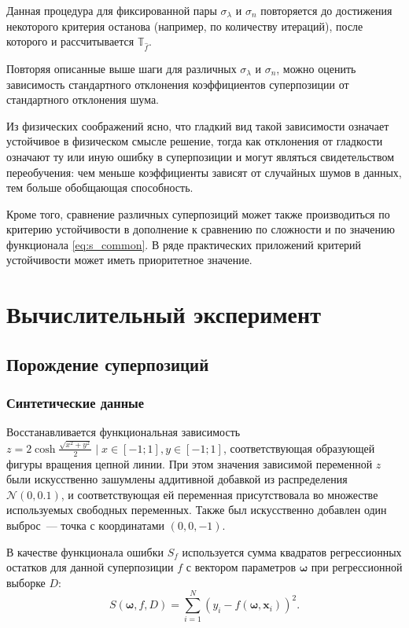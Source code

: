 \documentclass[12pt,a4paper]{article}
\begin{document}
Данная процедура для фиксированной пары $\sigma_{\lambda}$ и $\sigma_n$ повторяется
до достижения некоторого критерия останова (например, по количеству итераций),
после которого и рассчитывается $\mathbb{T}_{\hat{f}}$.

Повторяя описанные выше шаги для различных $\sigma_{\lambda}$ и $\sigma_n$, можно
оценить зависимость стандартного отклонения коэффициентов суперпозиции от
стандартного отклонения шума.

Из физических соображений ясно, что гладкий вид такой зависимости означает устойчивое в
физическом смысле решение, тогда как отклонения от гладкости означают
ту или иную ошибку в суперпозиции и могут являться свидетельством переобучения:
чем меньше коэффициенты зависят от случайных шумов в данных, тем больше обобщающая
способность.

Кроме того, сравнение различных суперпозиций может также производиться по
критерию устойчивости в дополнение к сравнению по сложности и по значению
функционала \eqref{eq:s_common}. В ряде практических приложений критерий устойчивости
может иметь приоритетное значение.

\section{Вычислительный эксперимент}

\subsection{Порождение суперпозиций}

\subsubsection{Синтетические данные}
Восстанавливается функциональная зависимость
$z = 2 \cosh \frac{\sqrt{x^2 + y^2}}{2} \mid x \in [-1; 1], y \in [-1; 1]$,
соответствующая образующей фигуры вращения цепной линии. При этом значения зависимой
переменной $z$ были искусственно зашумлены аддитивной добавкой из
распределения $\mathcal{N} (0, 0.1)$, и соответствующая ей переменная
присутствовала во множестве используемых свободных переменных.
Также был искусственно добавлен один
выброс~--- точка с координатами $(0, 0, -1)$.

В качестве функционала ошибки $S_f$ используется сумма квадратов
регрессионных остатков для данной суперпозиции $f$ с вектором параметров
$\boldsymbol{\omega}$ при регрессионной выборке $D$:
\begin{equation}
  \label{eq:sse_expr}
  S(\boldsymbol{\omega}, f, D) = \sum_{i=1}^N (y_i - f (\boldsymbol{\omega}, \mathbf{x}_i))^2.
\end{equation}
\end{document}
